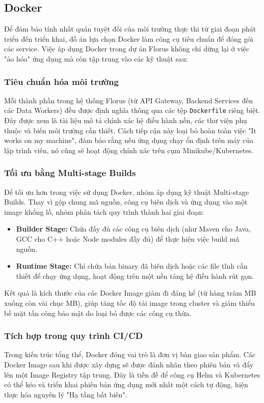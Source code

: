 \subsection{Docker}

Để đảm bảo tính nhất quán tuyệt đối của môi trường thực thi từ giai đoạn phát triển đến triển khai, đồ án lựa chọn Docker làm công cụ tiêu chuẩn để đóng gói các service. Việc áp dụng Docker trong dự án Florus không chỉ dừng lại ở việc "ảo hóa" ứng dụng mà còn tập trung vào các kỹ thuật sau:

\subsubsection{Tiêu chuẩn hóa môi trường} Mỗi thành phần trong hệ thống Florus (từ API Gateway, Backend Services đến các Data Workers) đều được định nghĩa thông qua các tệp \texttt{Dockerfile} riêng biệt. Đây được xem là tài liệu mô tả chính xác hệ điều hành nền, các thư viện phụ thuộc và biến môi trường cần thiết. Cách tiếp cận này loại bỏ hoàn toàn việc "It works on my machine", đảm bảo rằng nếu ứng dụng chạy ổn định trên máy của lập trình viên, nó cũng sẽ hoạt động chính xác trên cụm Minikube/Kubernetes.

\subsubsection{Tối ưu bằng Multi-stage Builds} 
Để tối ưu hơn trong việc sử dụng Docker, nhóm áp dụng kỹ thuật Multi-stage Builds. Thay vì gộp chung mã nguồn, công cụ biên dịch và ứng dụng vào một image khổng lồ, nhóm phân tách quy trình thành hai giai đoạn: 
\begin{itemize} 
     \item \textbf{Builder Stage:} Chứa đầy đủ các công cụ biên dịch (như Maven cho Java, GCC cho C++ hoặc Node modules đầy đủ) để thực hiện việc build mã nguồn. 
     \item \textbf{Runtime Stage:} Chỉ chứa bản binary đã biên dịch hoặc các file tĩnh cần thiết để chạy ứng dụng, hoạt động trên một nền tảng hệ điều hành rút gọn. 
\end{itemize} 

Kết quả là kích thước của các Docker Image giảm đi đáng kể (từ hàng trăm MB xuống còn vài chục MB), giúp tăng tốc độ tải image trong cluster và giảm thiểu bề mặt tấn công bảo mật do loại bỏ được các công cụ thừa.

\subsubsection{Tích hợp trong quy trình CI/CD} Trong kiến trúc tổng thể, Docker đóng vai trò là đơn vị bàn giao sản phẩm. Các Docker Image sau khi được xây dựng sẽ được đánh nhãn theo phiên bản và đẩy lên một Image Registry tập trung. Đây là tiền đề để công cụ Helm và Kubernetes có thể kéo và triển khai phiên bản ứng dụng mới nhất một cách tự động, hiện thực hóa nguyên lý "Hạ tầng bất biến".